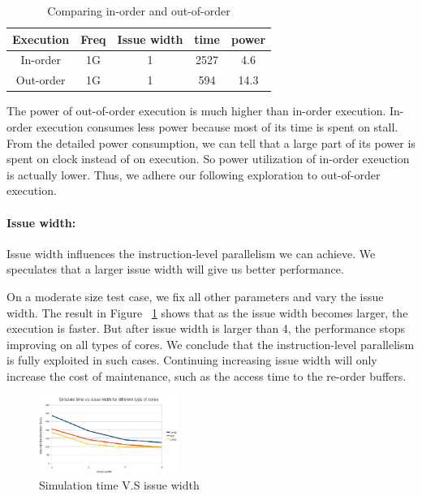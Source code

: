 \documentclass[twocolumn,letterpaper,10pt]{article}
\begin{document}
\begin{table}[ht!]
\begin{center}
\begin{tabular}{ccccc}
\toprule
Execution   &  Freq  & Issue width  &  time  & power \\
\midrule
In-order   &  1G  &  1  &  2527  &  4.6 \\
Out-order     &  1G &  1  &    594 & 14.3 \\
\bottomrule
\end{tabular}
\end{center}
\caption{Comparing in-order and out-of-order}
\end{table}

The power of out-of-order execution is much higher than in-order execution. In-order execution
consumes less power because most of its time is spent on stall. From
the detailed power consumption, we can tell that a
large part of its power is spent on clock instead of on execution. So
power utilization of in-order exeuction is actually lower. Thus, we adhere our following exploration to out-of-order execution.

\paragraph{Issue width:} Issue width influences the instruction-level
parallelism we can achieve. We speculates that a larger issue width
will give us better performance.

On a moderate size test case, we fix all other parameters and vary the issue
width. The result in Figure ~\ref{fig:issue} shows that as the issue width
becomes larger, the execution is faster. But after issue width
is larger than 4, the performance stops improving on all types of cores. We conclude that the
instruction-level parallelism is fully exploited in such cases. Continuing
increasing issue width will only increase the cost of maintenance, such as the access time to the re-order buffers.

\begin{figure}[ht!]
\begin{center}
\includegraphics[width=0.4\textwidth]{figures/issue.jpg}
\end{center}
\label{fig:issue}
\caption{Simulation time V.S issue width}
\end{figure}
\end{document}
